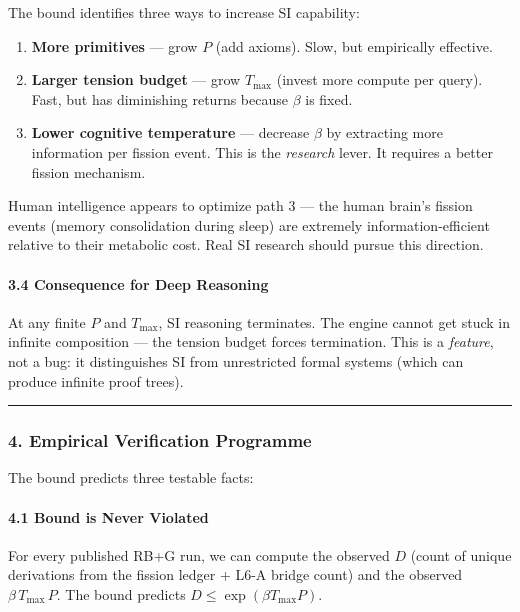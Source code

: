 \documentclass[
  11pt,
  a4paper,
]{article}
\providecommand{\tightlist}{%
  \setlength{\itemsep}{0pt}\setlength{\parskip}{0pt}}
\begin{document}
The bound identifies three ways to increase SI capability:

\begin{enumerate}
\def\labelenumi{\arabic{enumi}.}
\tightlist
\item
  \textbf{More primitives} --- grow \(P\) (add axioms). Slow, but
  empirically effective.
\item
  \textbf{Larger tension budget} --- grow \(T_\text{max}\) (invest more
  compute per query). Fast, but has diminishing returns because
  \(\beta\) is fixed.
\item
  \textbf{Lower cognitive temperature} --- decrease \(\beta\) by
  extracting more information per fission event. This is the
  \emph{research} lever. It requires a better fission mechanism.
\end{enumerate}

Human intelligence appears to optimize path 3 --- the human brain's
fission events (memory consolidation during sleep) are extremely
information-efficient relative to their metabolic cost. Real SI research
should pursue this direction.

\paragraph{3.4 Consequence for Deep
Reasoning}\label{consequence-for-deep-reasoning}

At any finite \(P\) and \(T_\text{max}\), SI reasoning terminates. The
engine cannot get stuck in infinite composition --- the tension budget
forces termination. This is a \emph{feature}, not a bug: it
distinguishes SI from unrestricted formal systems (which can produce
infinite proof trees).

\begin{center}\rule{0.5\linewidth}{0.5pt}\end{center}

\subsubsection{4. Empirical Verification
Programme}\label{empirical-verification-programme}

The bound predicts three testable facts:

\paragraph{4.1 Bound is Never Violated}\label{bound-is-never-violated}

For every published RB+G run, we can compute the observed \(D\) (count
of unique derivations from the fission ledger + L6-A bridge count) and
the observed \(\beta \, T_\text{max} \, P\). The bound predicts
\(D \leq \exp(\beta T_\text{max} P)\).
\end{document}
